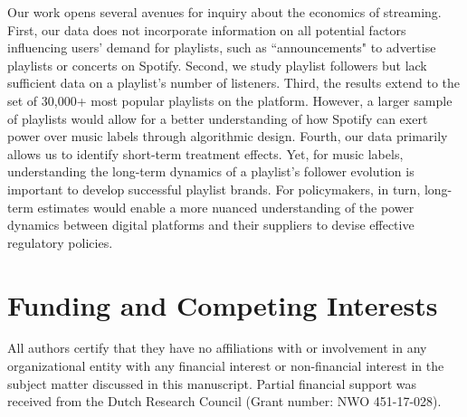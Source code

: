 \documentclass[12pt, a4paper, leqno]{article}
\begin{document}
Our work opens several avenues for inquiry about the economics of streaming. First, our data does not incorporate information on all potential factors influencing users' demand for playlists, such as ``announcements" to advertise playlists or concerts on Spotify. Second, we study playlist followers but lack sufficient data on a playlist's number of listeners. Third, the results extend to the set of 30,000+ most popular playlists on the platform. However, a larger sample of playlists would allow for a better understanding of how Spotify can exert power over music labels through algorithmic design. Fourth, our data primarily allows us to identify short-term treatment effects. Yet, for music labels, understanding the long-term dynamics of a playlist's follower evolution is important to develop successful playlist brands. For policymakers, in turn, long-term estimates would enable a more nuanced understanding of the power dynamics between digital platforms and their suppliers to devise effective regulatory policies.


\section*{Funding and Competing Interests} 
All authors certify that they have no affiliations with or involvement in any organizational entity with any financial interest or non-financial interest in the subject matter discussed in this manuscript. Partial financial support was received from the Dutch Research Council (Grant number: NWO 451-17-028).


\clearpage


\newpage
\appendix

%
\end{document}
